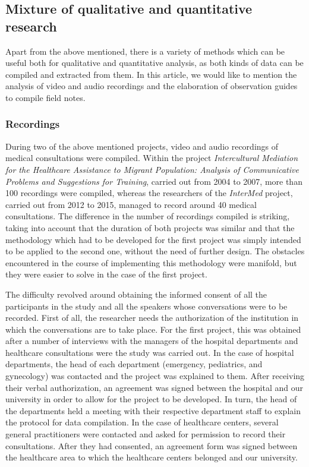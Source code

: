 \documentclass[output=paper]{LSP/langsci}
\begin{document}
\subsection{Mixture of qualitative and quantitative research}

Apart from the above mentioned, there is a variety of methods which can be useful both for qualitative and quantitative analysis, as both kinds of data can be compiled and extracted from them. In this article, we would like to mention the analysis of video and audio recordings and the elaboration of observation guides to compile field notes.

\subsubsection{Recordings}

During two of the above mentioned projects, video and audio recordings of medical consultations were compiled. Within the project \textit{Intercultural Mediation for the Healthcare Assistance to Migrant Population: Analysis of Communicative Problems and Suggestions for Training}, carried out from 2004 to 2007, more than 100 recordings were compiled, whereas the researchers of the \textit{InterMed} project, carried out from 2012 to 2015, managed to record around 40 medical consultations. The difference in the number of recordings compiled is striking, taking into account that the duration of both projects was similar and that the methodology which had to be developed for the first project was simply intended to be applied to the second one, without the need of further design. The obstacles encountered in the course of implementing this methodology were manifold, but they were easier to solve in the case of the first project. 

The difficulty revolved around obtaining the informed consent of all the participants in the study and all the speakers whose conversations were to be recorded. First of all, the researcher needs the authorization of the institution in which the conversations are to take place. For the first project, this was obtained after a number of interviews with the managers of the hospital departments and healthcare consultations were the study was carried out. In the case of hospital departments, the head of each department (emergency, pediatrics, and gynecology) was contacted and the project was explained to them. After receiving their verbal authorization, an agreement was signed between the hospital and our university in order to allow for the project to be developed. In turn, the head of the departments held a meeting with their respective department staff to explain the protocol for data compilation. In the case of healthcare centers, several general practitioners were contacted and asked for permission to record their consultations. After they had consented, an agreement form was signed between the healthcare area to which the healthcare centers belonged and our university.
\end{document}

